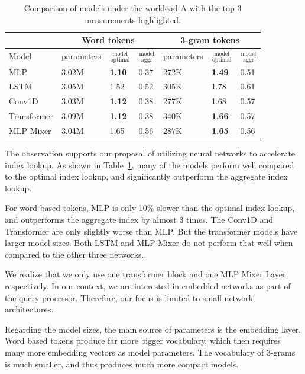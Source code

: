 \begin{table}[ht]
    \centering
    \begin{tabularx}{\textwidth}{|l|X||X|X||X|X|X|}
    \hline
    &    \multicolumn{3}{|c|}{Word tokens} & \multicolumn{3}{|c|}{3-gram tokens} \\ \hline
    Model 
        & parameters
        & $\frac{\mathrm{model}}{\mathrm{optimal}}$
        & $\frac{\mathrm{model}}{\mathrm{aggr}}$ 
        & parameters
        & $\frac{\mathrm{model}}{\mathrm{optimal}}$
        & $\frac{\mathrm{model}}{\mathrm{aggr}}$
        \\ \hline
    MLP & 3.02M & {\bf 1.10} & 0.37 & 272K & {\bf 1.49} & 0.51\\
    LSTM & 3.05M & 1.52 & 0.52 & 305K & 1.78 & 0.61 \\
    Conv1D & 3.03M & {\bf 1.12} & 0.38 & 277K & 1.68 & 0.57 \\
    Transformer & 3.09M & {\bf 1.12} & 0.38 & 340K & {\bf 1.66} & 0.57 \\
    MLP Mixer & 3.04M & 1.65 & 0.56 & 287K & {\bf 1.65} & 0.56 \\ \hline
    \end{tabularx}
    \caption{Comparison of models under the workload A with the top-3 measurements highlighted.}
    \label{tab:model-comparison}
\end{table}

The observation supports our proposal of utilizing neural networks to accelerate
index lookup.  As shown in Table~\ref{tab:model-comparison}, many of the models perform well compared to the optimal index lookup, and significantly outperform the aggregate index lookup.

For word based tokens, MLP is only 10\% slower than the optimal index lookup, and outperforms the aggregate index by almost 3 times. The Conv1D and Transformer are only slightly worse than MLP. But the transformer models have larger model sizes. Both LSTM and MLP Mixer do not perform that well when compared to the other three networks.

We realize that we only use one transformer block and one MLP Mixer Layer, respectively.  In our context, we are interested in embedded networks as part of the query processor. Therefore, our focus is limited to small network architectures.

Regarding the model sizes, the main source of parameters is the embedding layer.
Word based tokens produce far more bigger vocabulary, which then requires many more
embedding vectors as model parameters.  The vocabulary of 3-grams is much smaller, and thus produces much more compact models.

